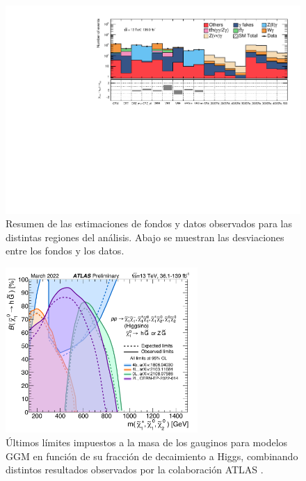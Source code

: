 \begin{figure}[ht!]
  \centering

    \includegraphics[width=\textwidth]{images/analysis_EWK/v192_2_nosyst/regions_pull.pdf}

    \caption{Resumen de las estimaciones de fondos y datos observados para las distintas regiones del análisis. Abajo se muestran las desviaciones entre los fondos y los datos.}
    \label{fig:pull_ewk}

\end{figure}

\begin{figure}[ht!]
  \centering

    \includegraphics[width=0.65\textwidth]{images/analysis_EWK/actual_limits.png}

    \caption{Últimos límites impuestos a la masa de los gauginos para modelos GGM en función de su fracción de decaimiento a Higgs, combinando distintos resultados observados por la colaboración ATLAS \cite{susy_public_results}.}
    \label{fig:ewk_limits}

\end{figure}


